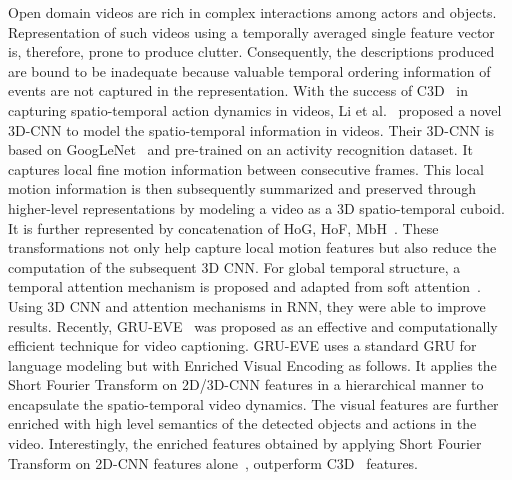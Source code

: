 \documentclass[10pt,journal,compsoc]{IEEEtran}
\begin{document}

Open domain videos are rich in complex interactions among actors and objects. Representation of such videos using a temporally averaged single feature vector is, therefore, prone to produce clutter. Consequently, the descriptions produced are bound to be inadequate because valuable temporal ordering information of events are not captured in the representation. With the success of C3D~\cite{c3dgenericfeatures} in capturing spatio-temporal action dynamics in videos, Li et al.~\cite{yao2015describing} proposed a novel 3D-CNN to model the spatio-temporal information in videos. Their 3D-CNN is based on GoogLeNet~\cite{szegedy2015going} and  pre-trained on an activity recognition dataset. It captures local fine motion information between consecutive frames. This local motion information is then subsequently summarized and preserved through higher-level representations by modeling a video as a 3D spatio-temporal cuboid. It is further represented by concatenation of HoG, HoF, MbH~\cite{dalal2006human, wang2009evaluation}. These transformations not only help capture local motion features but also reduce the computation of the subsequent 3D CNN. For global temporal structure, a temporal attention mechanism is proposed and adapted from soft attention~\cite{bahdanau2014neural}. Using 3D CNN and attention mechanisms in RNN, they were able to improve results. Recently, GRU-EVE~\cite{gruevehftsem} was proposed as an effective and computationally efficient technique for video captioning. GRU-EVE uses a standard GRU for language modeling but with Enriched Visual Encoding  as follows. It applies the Short Fourier Transform on 2D/3D-CNN features in a hierarchical manner to encapsulate the spatio-temporal video dynamics. The visual features are further enriched with high level semantics of the detected objects and actions in the video. Interestingly, the enriched features obtained by applying Short Fourier Transform on 2D-CNN features alone~\cite{gruevehftsem}, outperform C3D~\cite{c3dgenericfeatures} features.
\end{document}
